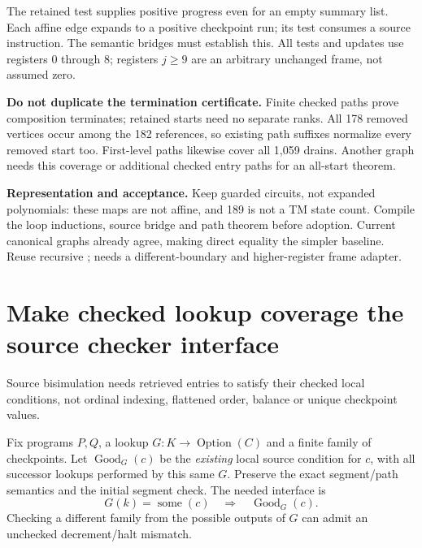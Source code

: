 \documentclass[11pt]{article}
\newcommand{\file}[1]{{\small\path{#1}}}
\begin{document}
The retained test supplies positive progress even for an empty summary list. Each affine edge expands to a positive checkpoint run; its test consumes a source instruction. The semantic bridges must establish this. All tests and updates use registers 0 through 8; registers $j\ge9$ are an arbitrary unchanged frame, not assumed zero.

\textbf{Do not duplicate the termination certificate.} Finite checked paths prove composition terminates; retained starts need no separate ranks. All 178 removed vertices occur among the 182 references, so existing path suffixes normalize every removed start too. First-level paths likewise cover all 1,059 drains. Another graph needs this coverage or additional checked entry paths for an all-start theorem.

\textbf{Representation and acceptance.} Keep guarded circuits, not expanded polynomials: these maps are not affine, and 189 is not a TM state count. Compile the loop inductions, source bridge and path theorem before adoption. Current canonical graphs already agree, making direct equality the simpler baseline. Reuse recursive \file{Cantor.tri}; \file{pair162} needs a different-boundary and higher-register frame adapter.

\newpage
\section{Make checked lookup coverage the source checker interface}
Source bisimulation needs retrieved entries to satisfy their checked local conditions, not ordinal indexing, flattened order, balance or unique checkpoint values.

Fix programs $P,Q$, a lookup $G:K\to\operatorname{Option}(C)$ and a finite family of checkpoints. Let $\operatorname{Good}_G(c)$ be the \emph{existing} local source condition for $c$, with all successor lookups performed by this same $G$. Preserve the exact segment/path semantics and the initial segment check. The needed interface is
\[
 G(k)=\operatorname{some}(c)\quad\Longrightarrow\quad
 \operatorname{Good}_G(c).
\]
Checking a different family from the possible outputs of $G$ can admit an unchecked decrement/halt mismatch.
\end{document}
